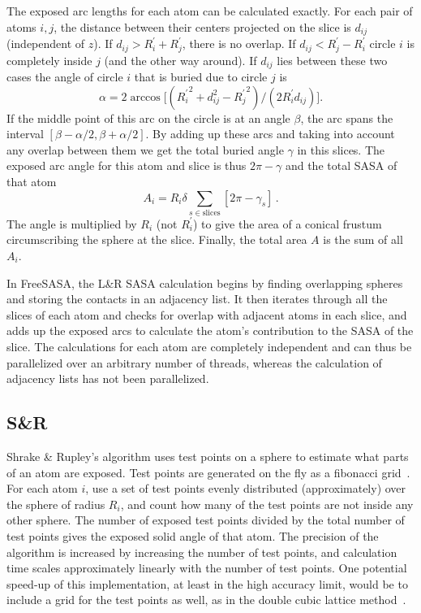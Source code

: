 \documentclass[a4paper,11pt]{article}
\begin{document}
The exposed arc lengths for each atom can be calculated exactly. For
each pair of atoms $i,j$, the distance between their centers projected
on the slice is $d_{ij}$ (independent of $z$). If $d_{ij} > R_i^\prime
+ R_j^\prime$, there is no overlap. If $d_{ij} < R_j^\prime -
R_i^\prime$ circle $i$ is completely inside $j$ (and the other way
around). If $d_{ij}$ lies between these two cases the angle of circle
$i$ that is buried due to circle $j$ is 
\begin{equation}
  \alpha = 2\arccos
  \bigl[({R_i^\prime}^2_{\,} + d_{ij}^2 - {R_{j}^\prime}^2_{\,})/(2R_i^\prime
  d_{ij})\bigr].
\end{equation}
If the middle point of this arc on the circle is at an angle $\beta$,
the arc spans the interval $[\beta-\alpha/2,\beta+\alpha/2]$. By
adding up these arcs and taking into account any overlap between them
we get the total buried angle $\gamma$ in this slices. The exposed
arc angle for this atom and slice is thus $2\pi-\gamma$ and the
total SASA of that atom
\begin{equation}\label{eq:LR_SASA}
  A_i =R_i \delta \sum_{s\in\text{slices}}
    \left[2\pi-\gamma_s\right]\,.
\end{equation}
The angle is multiplied by $R_i$ (not $R_i^\prime$) to give the area
of a conical frustum circumscribing the sphere at the slice. Finally,
the total area $A$ is the sum of all $A_i$.

In FreeSASA, the L\&R SASA calculation begins by finding overlapping
spheres and storing the contacts in an adjacency list. It then
iterates through all the slices of each atom and checks for overlap
with adjacent atoms in each slice, and adds up the exposed arcs to
calculate the atom's contribution to the SASA of the slice. The
calculations for each atom are completely independent and can thus be
parallelized over an arbitrary number of threads, whereas the
calculation of adjacency lists has not been parallelized.

\subsection{S\&R}

Shrake \& Rupley's algorithm uses test points on a sphere to estimate
what parts of an atom are exposed. Test points are generated on the
fly as a fibonacci grid~\cite{FibonacciGrid}.  For each atom $i$, use
a set of test points evenly distributed (approximately) over the
sphere of radius $R_i$, and count how many of the test points are not
inside any other sphere. The number of exposed test points divided by
the total number of test points gives the exposed solid angle of that
atom. The precision of the algorithm is increased by increasing the
number of test points, and calculation time scales approximately
linearly with the number of test points.  One potential speed-up of
this implementation, at least in the high accuracy limit, would be to
include a grid for the test points as well, as in the double cubic
lattice method~\cite{DCLM}.
 
\end{document}
